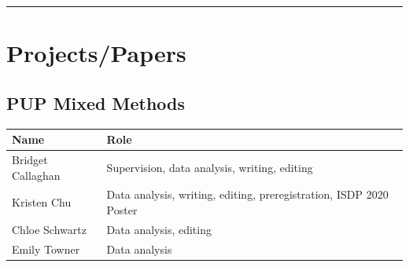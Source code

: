 \documentclass[]{book}
\begin{document}
\begin{center}\rule{0.5\linewidth}{0.5pt}\end{center}

\hypertarget{projectspapers}{%
\section{Projects/Papers}\label{projectspapers}}

\hypertarget{pup-mixed-methods}{%
\subsection{PUP Mixed Methods}\label{pup-mixed-methods}}

\begin{longtable}[]{@{}ll@{}}
\toprule
\begin{minipage}[b]{0.22\columnwidth}\raggedright
Name\strut
\end{minipage} & \begin{minipage}[b]{0.72\columnwidth}\raggedright
Role\strut
\end{minipage}\tabularnewline
\midrule
\endhead
\begin{minipage}[t]{0.22\columnwidth}\raggedright
Bridget Callaghan\strut
\end{minipage} & \begin{minipage}[t]{0.72\columnwidth}\raggedright
Supervision, data analysis, writing, editing\strut
\end{minipage}\tabularnewline
\begin{minipage}[t]{0.22\columnwidth}\raggedright
Kristen Chu\strut
\end{minipage} & \begin{minipage}[t]{0.72\columnwidth}\raggedright
Data analysis, writing, editing, preregistration, ISDP 2020 Poster\strut
\end{minipage}\tabularnewline
\begin{minipage}[t]{0.22\columnwidth}\raggedright
Chloe Schwartz\strut
\end{minipage} & \begin{minipage}[t]{0.72\columnwidth}\raggedright
Data analysis, editing\strut
\end{minipage}\tabularnewline
\begin{minipage}[t]{0.22\columnwidth}\raggedright
Emily Towner\strut
\end{minipage} & \begin{minipage}[t]{0.72\columnwidth}\raggedright
Data analysis\strut
\end{minipage}\tabularnewline
\bottomrule
\end{longtable}
\end{document}

